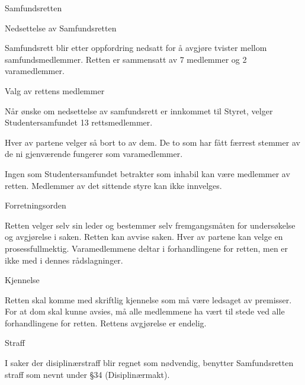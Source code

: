 \documentclass[fsbok.tex]{subfiles}
\begin{document}
\begin{lovkapittel}{Samfundsretten}

  \begin{lovparagraf}{Nedsettelse av Samfundsretten}
  
Samfundsrett blir etter oppfordring nedsatt for å avgjøre tvister mellom samfundsmedlemmer. Retten er sammensatt
av 7 medlemmer og 2 varamedlemmer.

  \end{lovparagraf}
  
  \begin{lovparagraf}{Valg av rettens medlemmer}

Når ønske om nedsettelse av samfundsrett er innkommet til Styret, velger Studentersamfundet 13 rettsmedlemmer.

Hver av partene velger så bort to av dem. De to som har fått færrest stemmer av de ni gjenværende fungerer som
varamedlemmer.

Ingen som Studentersamfundet betrakter som inhabil kan være medlemmer av retten. Medlemmer av det sittende styre
kan ikke innvelges.

  \end{lovparagraf}
  
  \begin{lovparagraf}{Forretningsorden}
  
Retten velger selv sin leder og bestemmer selv fremgangsmåten for undersøkelse og avgjørelse i saken. Retten kan
avvise saken. Hver av partene kan velge en prosessfullmektig. Varamedlemmene deltar i forhandlingene for retten,
men er ikke med i dennes rådslagninger.
  
  \end{lovparagraf}
  
  \begin{lovparagraf}{Kjennelse}
  
Retten skal komme med skriftlig kjennelse som må være ledsaget av premisser. For at dom skal kunne avsies, må alle
medlemmene ha vært til stede ved alle forhandlingene for retten. Rettens avgjørelse er endelig.
  
  \end{lovparagraf}
  
  \begin{lovparagraf}{Straff}
  
I saker der disiplinærstraff blir regnet som nødvendig, benytter Samfundsretten straff som nevnt under §34
(Disiplinærmakt).

  \end{lovparagraf}
  
\end{lovkapittel}
\end{document}
